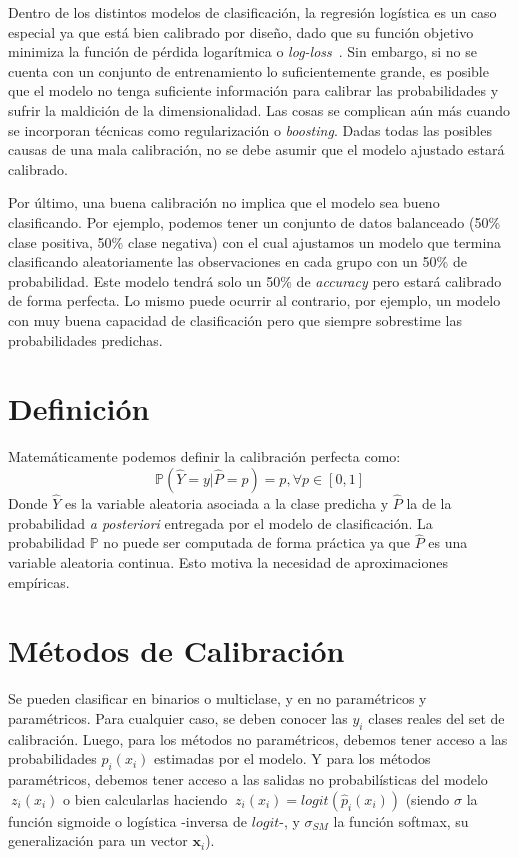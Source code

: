 Dentro de los distintos modelos de clasificación, la regresión logística es un
caso especial ya que está bien calibrado por diseño, dado que su función
objetivo minimiza la función de pérdida logarítmica o {\it
log-loss\/}~\cite{morrison2013tutorial}. Sin  embargo, si no se cuenta con un
conjunto de entrenamiento lo suficientemente grande, es posible que el modelo no
tenga suficiente información para calibrar las probabilidades y sufrir la
maldición de la dimensionalidad. Las cosas se complican aún más cuando se
incorporan técnicas como regularización o {\it boosting\/}. Dadas todas las
posibles causas de una mala calibración, no se debe asumir que el modelo
ajustado estará calibrado.

Por último, una buena calibración no implica que el modelo sea bueno
clasificando. Por ejemplo, podemos tener un conjunto de datos balanceado (50\%
clase positiva, 50\% clase negativa) con el cual ajustamos un modelo que termina
clasificando aleatoriamente las observaciones en cada grupo con un 50\% de
probabilidad. Este modelo tendrá solo un 50\% de {\it accuracy\/} pero estará
calibrado de forma perfecta. Lo mismo puede ocurrir al contrario, por ejemplo,
un modelo con muy buena capacidad de clasificación pero que siempre sobrestime
las probabilidades predichas.

\section{Definición}

Matemáticamente podemos definir la calibración perfecta como:
\begin{equation}
    \mathbb{P}(\hat{Y}=y|\hat{P}=p) = p, \forall p \in [0,1]\label{ecuacion:perfect_calibration}
\end{equation}
Donde \(\hat{Y}\) es la variable aleatoria asociada a la clase predicha y
\(\hat{P}\) la de la probabilidad {\it a posteriori\/} entregada por el modelo
de clasificación. La probabilidad \(\mathbb{P}\) no puede ser computada de forma
práctica ya que \(\hat{P}\) es una variable aleatoria continua. Esto motiva la
necesidad de aproximaciones empíricas.

\section{Métodos de Calibración}

Se pueden clasificar en binarios o multiclase, y en no paramétricos y
paramétricos. Para cualquier caso, se deben conocer las $y_{i}$ clases reales
del set de calibración. Luego, para los métodos no paramétricos, debemos tener
acceso a las probabilidades $\hat p_{i}(x_i)$ estimadas por el modelo. Y para
los métodos paramétricos, debemos tener acceso a las salidas no probabilísticas
del modelo $\ z_{i}(x_i)$ o bien calcularlas haciendo $\ z_{i}(x_i) = logit(\hat
p_{i}(x_i))$ (siendo $\sigma$ la función sigmoide o logística -inversa de
$logit$-, y $\sigma_{SM}$ la función softmax, su generalización para un vector
$\boldsymbol{x}_i$).

